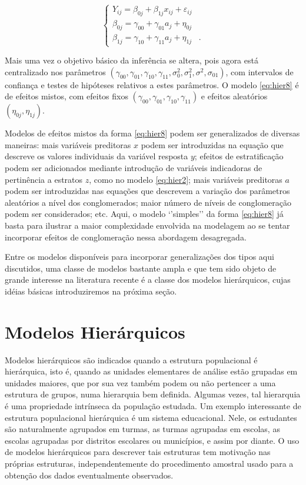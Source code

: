 \documentclass[]{book}
\theoremstyle{definition}
\theoremstyle{definition}
\theoremstyle{definition}
\theoremstyle{remark}
\begin{document}
\begin{equation}
\left\{ 
\begin{array}{l}
Y_{ij}=\beta _{0j}+\beta _{1j}x_{ij}+\varepsilon _{ij} \\ 
\beta _{0j}=\gamma _{00}+\gamma _{01}a_{j}+\eta _{0j} \\ 
\beta _{1j}=\gamma _{10}+\gamma _{11}a_{j}+\eta _{1j}\;\;\;.
\end{array}
\right.  \label{eq:hier8}
\end{equation}

Mais uma vez o objetivo básico da inferência se altera, pois agora está
centralizado nos parâmetros
\(\left( \gamma _{00},\gamma_{01},\gamma _{10},\gamma _{11},\sigma _{0}^{2},\sigma _{1}^{2},\sigma^{2},\sigma _{01}\right)\),
com intervalos de confiança e testes de hipóteses relativos a estes
parâmetros. O modelo \eqref{eq:hier8} é de efeitos mistos, com efeitos
fixos
\(\left( \gamma _{00},\gamma_{01},\gamma _{10},\gamma _{11}\right)\) e
efeitos aleatórios \(\left(\eta _{0j},\eta _{1j}\right)\).

Modelos de efeitos mistos da forma \eqref{eq:hier8} podem ser
generalizados de diversas maneiras: mais variáveis preditoras \(x\)
podem ser introduzidas na equação que descreve os valores individuais da
variável resposta \(y\); efeitos de estratificação podem ser adicionados
mediante introdução de variáveis indicadoras de pertinência a estratos
\(z\), como no modelo \eqref{eq:hier2}; mais variáveis preditoras \(a\)
podem ser introduzidas nas equações que descrevem a variação dos
parâmetros aleatórios a nível dos conglomerados; maior número de níveis
de conglomeração podem ser considerados; etc. Aqui, o modelo `'simples''
da forma \eqref{eq:hier8} já basta para ilustrar a maior complexidade
envolvida na modelagem ao se tentar incorporar efeitos de conglomeração
nessa abordagem desagregada.

Entre os modelos disponíveis para incorporar generalizações dos tipos
aqui discutidos, uma classe de modelos bastante ampla e que tem sido
objeto de grande interesse na literatura recente é a classe dos modelos
hierárquicos, cujas idéias básicas introduziremos na próxima seção.

\section{Modelos Hierárquicos}\label{modelos-hierarquicos-1}

Modelos hierárquicos são indicados quando a estrutura populacional é
hierárquica, isto é, quando as unidades elementares de análise estão
grupadas em unidades maiores, que por sua vez também podem ou não
pertencer a uma estrutura de grupos, numa hierarquia bem definida.
Algumas vezes, tal hierarquia é uma propriedade intrínseca da população
estudada. Um exemplo interessante de estrutura populacional hierárquica
é um sistema educacional. Nele, os estudantes são naturalmente agrupados
em turmas, as turmas agrupadas em escolas, as escolas agrupadas por
distritos escolares ou municípios, e assim por diante. O uso de modelos
hierárquicos para descrever tais estruturas tem motivação nas próprias
estruturas, independentemente do procedimento amostral usado para a
obtenção dos dados eventualmente observados.
\end{document}
